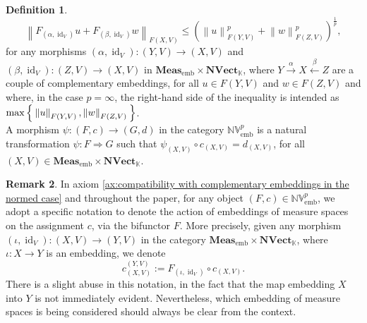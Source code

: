 \documentclass{amsart}
\theoremstyle{definition}
\newtheorem{definition}{Definition}[section]
\newtheorem{remark}[definition]{Remark}
\theoremstyle{plain}
\newcommand{\norm}[1]{\left\lVert #1\right\rVert} %
\newcommand{\id}{\operatorname{id}}
\newcommand{\embMeas}{\mathbf{Meas}_\mathrm{emb}}
\newcommand{\NVect}{\mathbf{NVect}_{\mathbb{K}}}
\newcommand{\NVembp}{\mathbb{NV}_{\mathrm{emb}}^p}
\begin{document}
\begin{definition}
\begin{equation}
                \norm{F_{(\alpha,\id_V)}u + F_{(\beta,\id_V)}w}_{F(X,V)} \leq \left( \norm{u}_{F(Y,V)}^p + \norm{w}_{F(Z,V)}^p \right)^{\frac{1}{p}},
            \end{equation}
            for any morphisms $(\alpha,\id_V) \colon (Y,V) \rightarrow (X,V)$ and $(\beta,\id_V) \colon (Z,V) \rightarrow (X,V)$ in $\embMeas \times \NVect$, where $Y \xrightarrow{~\alpha~} X \xleftarrow{~\beta~} Z$ are a couple of complementary embeddings, for all $u \in F(Y,V)$ and $w \in F(Z,V)$ and where, in the case $p = \infty$, the right-hand side of the inequality is intended as $\max \Set{\norm{u}_{F(Y,V)},\norm{w}_{F(Z,V)}}$. \\
            A morphism $\psi \colon (F,c) \rightarrow (G,d)$ in the category $\NVembp$ is a natural transformation $\psi \colon F \Rightarrow G$ such that $\psi_{(X,V)} \circ c_{(X,V)} = d_{(X,V)}$, for all $(X,V) \in \embMeas \times \NVect$.
        \end{definition}

        \begin{remark}
        \label{rem:notation for the maps c}
            In axiom \ref{ax:compatibility with complementary embeddings in the normed case} and throughout the paper, for any object $(F,c) \in \NVembp$, we adopt a specific notation to denote the action of embeddings of measure spaces on the assignment $c$, via the bifunctor $F$.
            More precisely, given any morphism $(\iota,\id_V) \colon (X,V) \rightarrow (Y,V)$ in the category $\embMeas \times \NVect$, where $\iota \colon X \rightarrow Y$ is an embedding, we denote
            \begin{equation*}
                c_{(X,V)}^{(Y,V)} := F_{(\iota,\id_V)} \circ c_{(X,V)}.
            \end{equation*}
            There is a slight abuse in this notation, in the fact that the map embedding $X$ into $Y$ is not immediately evident.
            Nevertheless, which embedding of measure spaces is being considered should always be clear from the context. 
        \end{remark}
\end{document}

